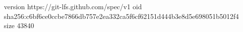 version https://git-lfs.github.com/spec/v1
oid sha256:c6bf6ce0ccbe7866db757e2ea332ca5f6cf62151d444b3e8d5e698051b5012f4
size 43840
